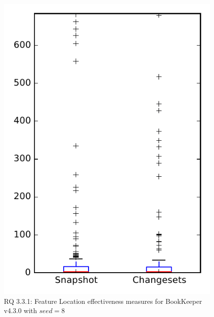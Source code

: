 
\begin{figure}
\centering
\includegraphics[height=0.4\textheight]{figures/flt_seed/rq1_bookkeeper_8}
\caption{RQ 3.3.1: Feature Location effectiveness measures for BookKeeper v4.3.0 with $seed=8$}
\label{fig:flt_seed:rq1:bookkeeper}
\end{figure}
